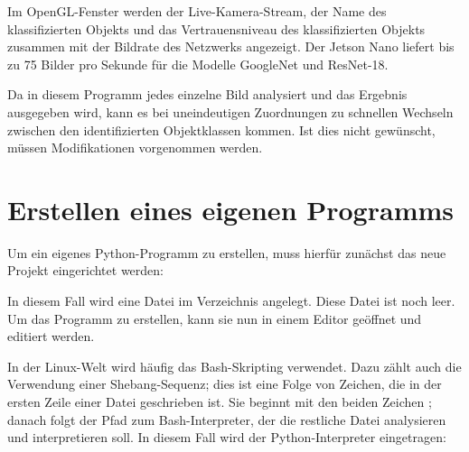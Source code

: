 
\medskip

Im OpenGL-Fenster werden der Live-Kamera-Stream, der Name des klassifizierten Objekts und das Vertrauensniveau des klassifizierten Objekts zusammen mit der Bildrate des Netzwerks angezeigt. Der Jetson Nano liefert bis zu 75 Bilder pro Sekunde für die Modelle GoogleNet und ResNet-18. 

\medskip

Da in diesem Programm jedes einzelne Bild analysiert und das Ergebnis ausgegeben wird, kann es bei uneindeutigen Zuordnungen zu schnellen Wechseln zwischen den identifizierten Objektklassen kommen. Ist dies nicht gewünscht, müssen Modifikationen vorgenommen werden.



\section{Erstellen eines eigenen Programms}
Um ein eigenes Python-Programm zu erstellen, muss hierfür zunächst das neue Projekt eingerichtet werden:

\medskip







\medskip

 
 
In diesem Fall wird eine Datei  im Verzeichnis  angelegt. Diese Datei ist noch leer. Um das Programm zu erstellen, kann sie nun in einem Editor geöffnet und editiert werden.



In der Linux-Welt wird häufig das Bash-Skripting verwendet. Dazu zählt auch die Verwendung einer Shebang-Sequenz; dies ist eine Folge von Zeichen, die in der ersten Zeile einer Datei geschrieben ist. Sie beginnt mit den beiden Zeichen \PYTHON{\#!}; danach folgt der Pfad zum Bash-Interpreter, der die restliche Datei analysieren und interpretieren soll. In diesem Fall wird der Python-Interpreter eingetragen:



